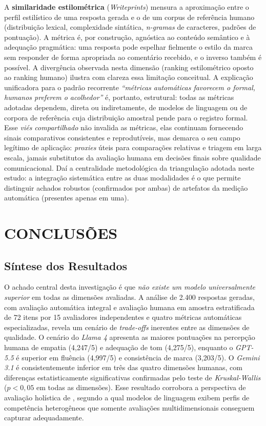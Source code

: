 \documentclass[12pt, a4paper]{article}
\numberwithin{equation}{section}
\begin{document}
A \textbf{similaridade estilométrica} (\textit{Writeprints}) mensura a aproximação entre o perfil estilístico de uma resposta gerada e o de um corpus de referência humano (distribuição lexical, complexidade sintática, \textit{n-gramas} de caracteres, padrões de pontuação). A métrica é, por construção, agnóstica ao conteúdo semântico e à adequação pragmática: uma resposta pode espelhar fielmente o estilo da marca sem responder de forma apropriada ao comentário recebido, e o inverso também é possível. A divergência observada nesta dimensão (ranking estilométrico oposto ao ranking humano) ilustra com clareza essa limitação conceitual. A explicação unificadora para o padrão recorrente \textit{``métricas automáticas favorecem o formal, humanos preferem o acolhedor''} é, portanto, estrutural: todas as métricas adotadas dependem, direta ou indiretamente, de modelos de linguagem ou de corpora de referência cuja distribuição amostral pende para o registro formal. Esse \textit{viés compartilhado} não invalida as métricas, elas continuam fornecendo sinais comparativos consistentes e reprodutíveis, mas demarca o seu campo legítimo de aplicação: \textit{proxies} úteis para comparações relativas e triagem em larga escala, jamais substitutos da avaliação humana em decisões finais sobre qualidade comunicacional. Daí a centralidade metodológica da triangulação adotada neste estudo: a integração sistemática entre as duas modalidades é o que permite distinguir achados robustos (confirmados por ambas) de artefatos da medição automática (presentes apenas em uma).

\section{CONCLUSÕES}

\subsection{Síntese dos Resultados}

O achado central desta investigação é que \textit{não existe um modelo universalmente superior} em todas as dimensões avaliadas. A análise de 2.400 respostas geradas, com avaliação automática integral e avaliação humana em amostra estratificada de 72 itens por 15 avaliadores independentes e quatro métricas automáticas especializadas, revela um cenário de \textit{trade-offs} inerentes entre as dimensões de qualidade. O cenário do \textit{Llama 4} apresenta as maiores pontuações na percepção humana de empatia (4,247/5) e adequação de tom (4,275/5), enquanto o \textit{GPT-5.5} é superior em fluência (4,997/5) e consistência de marca (3,203/5). O \textit{Gemini 3.1} é consistentemente inferior em três das quatro dimensões humanas, com diferenças estatisticamente significativas confirmadas pelo teste de \textit{Kruskal-Wallis} ($p < 0{,}05$ em todas as dimensões). Esse resultado corrobora a perspectiva de avaliação holística de , segundo a qual modelos de linguagem exibem perfis de competência heterogêneos que somente avaliações multidimensionais conseguem capturar adequadamente.
\end{document}
